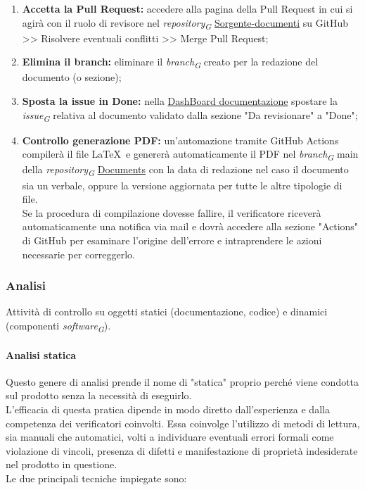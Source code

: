 \begin{enumerate}
    \item \textbf{Accetta la Pull Request:} 
        accedere alla pagina della Pull Request in cui si agirà con il ruolo di revisore nel \textit{repository}\textsubscript{\textit{G}} \href{https://github.com/ByteOps-swe/Sorgente-documenti}{Sorgente-documenti} su GitHub >> Risolvere eventuali conflitti >> Merge Pull Request;
    \item \textbf{Elimina il branch:} 
        eliminare il \textit{branch}\textsubscript{\textit{G}} creato per la redazione del documento (o sezione);
    \item \textbf{Sposta la issue in Done:} 
        nella \href{https://github.com/orgs/ByteOps-swe/projects/1/views/1}{DashBoard documentazione} spostare la \textit{issue}\textsubscript{\textit{G}} relativa al documento validato dalla sezione "Da revisionare" a "Done";
    \item \textbf{Controllo generazione PDF:} 
        un'automazione tramite GitHub Actions compilerà il file \LaTeX\ e genererà automaticamente il PDF nel \textit{branch}\textsubscript{\textit{G}} main della \textit{repository}\textsubscript{\textit{G}} \href{https://github.com/ByteOps-swe/Documents}{Documents} con la data di redazione nel caso il documento sia un verbale, oppure la versione aggiornata per tutte le altre tipologie di file. \\
        Se la procedura di compilazione dovesse fallire, il verificatore riceverà automaticamente una notifica via mail e dovrà accedere alla sezione "Actions" di GitHub per esaminare l'origine dell'errore e intraprendere le azioni necessarie per correggerlo.
\end{enumerate}

\subsubsection{Analisi}
Attività di controllo su oggetti statici (documentazione, codice) e dinamici (componenti \textit{software}\textsubscript{\textit{G}}).

\paragraph{Analisi statica}
Questo genere di analisi prende il nome di "statica" proprio perché viene condotta sul prodotto senza la necessità di eseguirlo. \\ L'efficacia di questa pratica dipende in modo diretto dall'esperienza e dalla competenza dei verificatori coinvolti. Essa coinvolge l'utilizzo di metodi di lettura, sia manuali che automatici, volti a individuare eventuali errori formali come violazione di vincoli, presenza di difetti e manifestazione di proprietà indesiderate nel prodotto in questione. \\
Le due principali tecniche impiegate sono:


